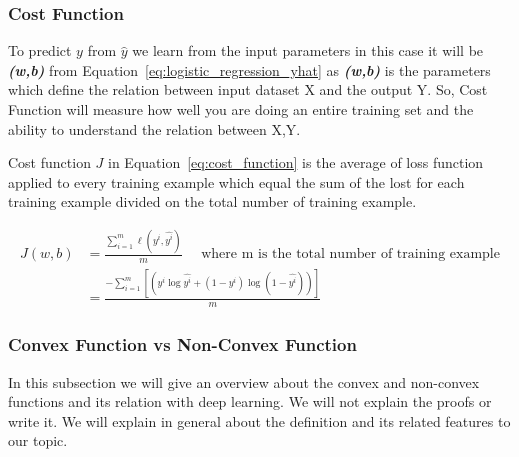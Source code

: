 \subsubsection{Cost Function}
    To predict $y$ from $\widehat{y}$ we learn from the input parameters in this case it will be \textbf{\textit{(w,b)}} from Equation~\eqref{eq:logistic_regression_yhat} as  \textbf{\textit{(w,b)}} is the parameters which define the relation between input dataset X and the output Y. So, Cost Function will measure how well you are doing an entire training set and the ability to understand the relation between X,Y.

Cost function \textbf{\textit{$J$}} in Equation~\eqref{eq:cost_function} is the average of loss function applied to every training example which equal the sum of the lost for each training example divided on the total number of training example.



\begin{equation}\label{eq:cost_function}
  \begin{split}
  J(w,b) & = \frac{\sum_{i=1}^{m}  \ell(y^i,\widehat{y^i})}{m} \quad \text{ where m is the total number of training example} \\
  & = \frac {- \sum_{i=1}^{m} [(y^i \log \widehat{y^i} + (1-y^i) \log (1-\widehat{y^i}))]}{m}  
  \end{split}
\end{equation}


\subsubsection{Convex Function vs Non-Convex Function }
In this subsection we will give an overview about the convex and non-convex functions and its relation with deep learning. We will not explain the proofs or write it. We will explain in general about the definition and its related features to our topic.

